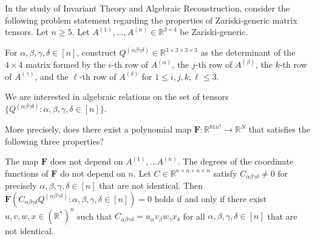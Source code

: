 In the study of Invariant Theory and Algebraic Reconstruction, consider the following problem statement regarding the properties of Zariski-generic matrix tensors.
Let $n \geq 5$.  
Let $A^{(1)}, \ldots, A^{(n)} \in \mathbb{R}^{3 \times 4}$ be Zariski-generic.   

For $\alpha, \beta, \gamma, \delta \in [n]$, construct $Q^{(\alpha \beta \gamma \delta)} \in \mathbb{R}^{3 \times 3 \times 3 \times 3}$ as the determinant of the $4 \times 4$ matrix formed by the $i$-th row of $A^{(\alpha)}$, the $j$-th row of $A^{(\beta)}$, the $k$-th row of $A^{(\gamma)}$, and the $\ell$-th row of $A^{(\delta)}$ for $1 \leq i, j, k, \ell \leq 3$.

We are interested in algebraic relations on the set of tensors $\{Q^{(\alpha \beta \gamma \delta)} : \alpha, \beta, \gamma, \delta \in [n] \}$.

More precisely, does there exist a polynomial map $\mathbf{F}: \mathbb{R}^{81n^4} \rightarrow \mathbb{R}^N$ that satisfies the following three properties?

The map $\mathbf{F}$ does not depend on $A^{(1)}, \ldots A^{(n)}$. 
The degrees of the coordinate functions of $\mathbf{F}$ do not depend on $n$.
Let $C \in \mathbb{R}^{n \times n \times n \times n}$ satisfy $C_{\alpha \beta \gamma \delta} \neq 0$ for precisely $\alpha, \beta, \gamma, \delta \in [n]$ that are not identical.  Then $\mathbf{F}(C_{\alpha \beta \gamma \delta} Q^{(\alpha \beta \gamma \delta)} : \alpha, \beta, \gamma, \delta \in [n]) = 0$ holds if and only if there exist $u, v, w, x \in (\mathbb{R}^*)^n$ such that $C_{\alpha \beta \gamma \delta} = u_{\alpha} v_{\beta} w_{\gamma} x_{\delta}$ for all $\alpha, \beta, \gamma, \delta \in [n]$ that are not identical. 